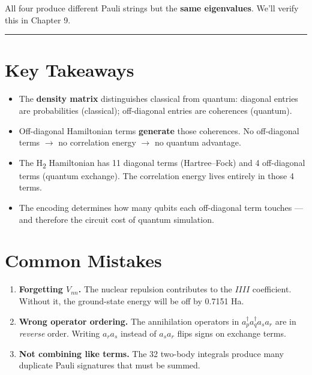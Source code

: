 \documentclass[
  11pt,
  oneside]{book}
\providecommand{\tightlist}{%
  \setlength{\itemsep}{0pt}\setlength{\parskip}{0pt}}
\begin{document}
All four produce different Pauli strings but the \textbf{same
eigenvalues}. We'll verify this in Chapter 9.

\begin{center}\rule{0.5\linewidth}{0.5pt}\end{center}

\section{Key Takeaways}\label{key-takeaways-5}

\begin{itemize}
\tightlist
\item
  The \textbf{density matrix} distinguishes classical from quantum:
  diagonal entries are probabilities (classical); off-diagonal entries
  are coherences (quantum).
\item
  Off-diagonal Hamiltonian terms \textbf{generate} those coherences. No
  off-diagonal terms $\rightarrow$ no correlation energy $\rightarrow$ no quantum advantage.
\item
  The H\textsubscript{2} Hamiltonian has 11 diagonal terms (Hartree--Fock) and 4
  off-diagonal terms (quantum exchange). The correlation energy lives
  entirely in those 4 terms.
\item
  The encoding determines how many qubits each off-diagonal term touches
  --- and therefore the circuit cost of quantum simulation.
\end{itemize}

\section{Common Mistakes}\label{common-mistakes-5}

\begin{enumerate}
\def\labelenumi{\arabic{enumi}.}
\item
  \textbf{Forgetting \(V_{nn}\).} The nuclear repulsion contributes to
  the \(IIII\) coefficient. Without it, the ground-state energy will be
  off by 0.7151 Ha.
\item
  \textbf{Wrong operator ordering.} The annihilation operators in
  \(a_p^\dagger a_q^\dagger a_s a_r\) are in \emph{reverse} order.
  Writing \(a_r a_s\) instead of \(a_s a_r\) flips signs on exchange
  terms.
\item
  \textbf{Not combining like terms.} The 32 two-body integrals produce
  many duplicate Pauli signatures that must be summed.
\end{enumerate}
\end{document}
